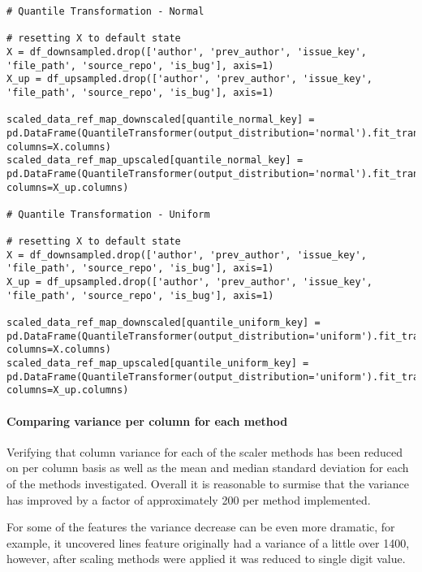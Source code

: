 \begin{landscape}
\begin{code}
\begin{verbatim}
# Quantile Transformation - Normal

# resetting X to default state
X = df_downsampled.drop(['author', 'prev_author', 'issue_key', 'file_path', 'source_repo', 'is_bug'], axis=1)
X_up = df_upsampled.drop(['author', 'prev_author', 'issue_key', 'file_path', 'source_repo', 'is_bug'], axis=1)

scaled_data_ref_map_downscaled[quantile_normal_key] = pd.DataFrame(QuantileTransformer(output_distribution='normal').fit_transform(X), columns=X.columns)
scaled_data_ref_map_upscaled[quantile_normal_key] = pd.DataFrame(QuantileTransformer(output_distribution='normal').fit_transform(X_up), columns=X_up.columns)

# Quantile Transformation - Uniform

# resetting X to default state
X = df_downsampled.drop(['author', 'prev_author', 'issue_key', 'file_path', 'source_repo', 'is_bug'], axis=1)
X_up = df_upsampled.drop(['author', 'prev_author', 'issue_key', 'file_path', 'source_repo', 'is_bug'], axis=1)

scaled_data_ref_map_downscaled[quantile_uniform_key] = pd.DataFrame(QuantileTransformer(output_distribution='uniform').fit_transform(X), columns=X.columns)
scaled_data_ref_map_upscaled[quantile_uniform_key] = pd.DataFrame(QuantileTransformer(output_distribution='uniform').fit_transform(X_up), columns=X_up.columns)
\end{verbatim}
\end{code}
\end{landscape}

\paragraph{Comparing variance per column for each method}
Verifying that column variance for each of the scaler methods has been reduced on per column basis as well as the mean and median standard deviation for each of the methods investigated. Overall it is reasonable to surmise that the variance has improved by a factor of approximately 200 per method implemented.

For some of the features the variance decrease can be even more dramatic, for example, it uncovered lines feature originally had a variance of a little over 1400, however, after scaling methods were applied it was reduced to single digit value.

